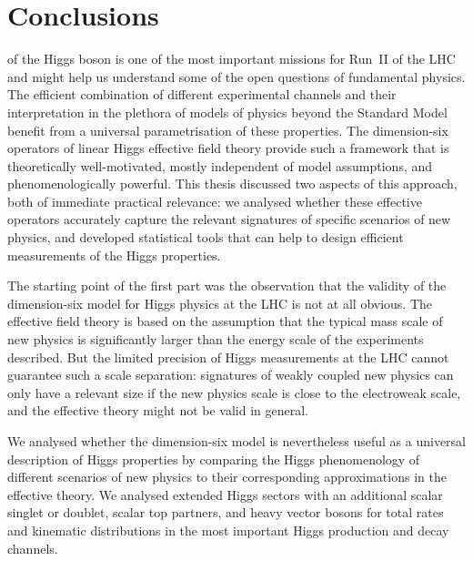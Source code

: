 
 
\chapter{Conclusions}
\label{chapter:conclusions}

 of the Higgs boson is one of
the most important missions for Run~II of the LHC and might help us
understand some of the open questions of fundamental physics. The
efficient combination of different experimental channels and their
interpretation in the plethora of models of physics beyond the
Standard Model benefit from a universal parametrisation of these
properties. The dimension-six operators of linear Higgs effective
field theory provide such a framework that is theoretically
well-motivated, mostly independent of model assumptions, and
phenomenologically powerful. This thesis discussed two aspects of this
approach, both of immediate practical relevance: we analysed whether
these effective operators accurately capture the relevant signatures
of specific scenarios of new physics, and developed statistical tools
that can help to design efficient measurements of the Higgs
properties.

\newparagraph
%
The starting point of the first part was the observation that the
validity of the dimension-six model for Higgs physics at the LHC is
not at all obvious. The effective field theory is based on the
assumption that the typical mass scale of new physics is significantly
larger than the energy scale of the experiments described. But the
limited precision of Higgs measurements at the LHC cannot guarantee
such a scale separation: signatures of weakly coupled new physics can
only have a relevant size if the new physics scale is close to the
electroweak scale, and the effective theory might not be valid in
general.

We analysed whether the dimension-six model is nevertheless useful as
a universal description of Higgs properties by comparing the Higgs
phenomenology of different scenarios of new physics to their
corresponding approximations in the effective theory. We analysed
extended Higgs sectors with an additional scalar singlet or doublet,
scalar top partners, and heavy vector bosons for total rates and
kinematic distributions in the most important Higgs production and
decay channels.

